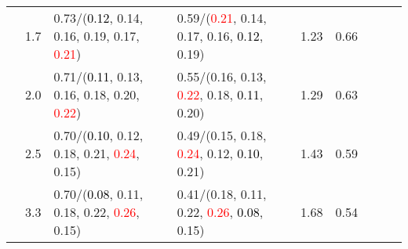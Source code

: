 \documentclass[10pt,a4paper]{report}
\begin{document}
\begin{table}[!htbp]
\begin{center}
{\begin{tabular}{ccllccccc}
				  & 1.7                               & 0.73/(\textcolor{black}{0.12}, 0.14, 0.16, 0.19, 0.17, \textcolor{red}{0.21})                                                                   & 0.59/(\textcolor{red}{0.21}, 0.14, 0.17, 0.16, \textcolor{black}{0.12}, 0.19)                                                                   & 1.23             & 0.66                     \\
				  & 2.0                               & 0.71/(\textcolor{black}{0.11}, 0.13, 0.16, 0.18, 0.20, \textcolor{red}{0.22})                                                                   & 0.55/(0.16, 0.13, \textcolor{red}{0.22}, 0.18, \textcolor{black}{0.11}, 0.20)                                                                   & 1.29             & 0.63                     \\
				  & 2.5                               & 0.70/(\textcolor{black}{0.10}, 0.12, 0.18, 0.21, \textcolor{red}{0.24}, 0.15)                                                                   & 0.49/(0.15, 0.18, \textcolor{red}{0.24}, 0.12, \textcolor{black}{0.10}, 0.21)                                                                   & 1.43             & 0.59                     \\
				  & 3.3                               & 0.70/(\textcolor{black}{0.08}, 0.11, 0.18, 0.22, \textcolor{red}{0.26}, 0.15)                                                                   & 0.41/(0.18, 0.11, 0.22, \textcolor{red}{0.26}, \textcolor{black}{0.08}, 0.15)                                                                   & 1.68             & 0.54                     \\
				\bottomrule
			\end{tabular}}
	\end{center}
\end{table}
\end{document}
